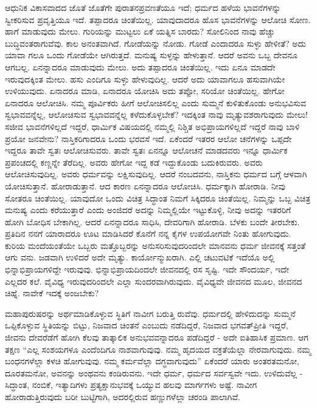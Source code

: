 ಆಧುನಿಕ ವಿಕಾಸವಾದದ ಜೊತೆ ಜೊತೆಗೇ ಪುರಾತನಪ್ರವಣತೆಯೂ  ಇದೆ; ಧರ್ಮದ ಹಳೆಯ ಭಾವನೆಗಳನ್ನು ಸ್ವೀಕರಿಸುವ ಪ್ರವೃತ್ತಿಯೂ ಇದೆ. ತಪ್ಪಾದರೂ ಚಿಂತೆಯಿಲ್ಲ. ಯಾವುದಾದರೂ ಹೊಸ ಭಾವನೆಗಳನ್ನು ಆಲೋಚಿ ಸೋಣ. ಹಾಗೆ ಮಾಡುವುದು ಮೇಲು. ಗುರಿಯನ್ನು ಮುಟ್ಟಲು ಏಕೆ ಯತ್ನಿಸ ಬಾರದು? ಸೋಲಿನಿಂದ ನಾವು ಹೆಚ್ಚು ಬುದ್ಧಿವಂತರಾಗುವೆವು. ಕಾಲ ಅನಂತವಾಗಿದೆ. ಗೋಡೆಯನ್ನು ನೋಡು. ಗೋಡೆ ಎಂದಾದರೂ ಸುಳ್ಳು ಹೇಳೀತೆ? ಅದು ಯಾವಾ ಗಲೂ ಒಂದು ಗೋಡೆಯೇ ಆಗಿರುತ್ತದೆ. ಮನುಷ್ಯ ಸುಳ್ಳನ್ನು ಹೇಳುತ್ತಾನೆ. ಆದರೆ ಅವನು ಒಬ್ಬ ದೇವನೂ ಆಗಬಲ್ಲ. ಏನನ್ನಾದರೂ ಮಾಡುವುದು ಮೇಲು. ಅದು ತಪ್ಪಾದರೂ ಚಿಂತೆಯಿಲ್ಲ. ಇದು ಏನೂ ಮಾಡದೇ ಇರುವುದಕ್ಕಿಂತ ಮೇಲು. ಹಸು ಎಂದಿಗೂ ಸುಳ್ಳು ಹೇಳುವುದಿಲ್ಲ. ಆದರೆ ಅದು ಯಾವಾಗಲೂ ಹಸುವಾಗಿಯೇ ಉಳಿಯುವುದು. ಏನಾದರೂ ಮಾಡಿ, ಏನಾದರೂ ಯೋಚಿಸಿ ಅದು ತಪ್ಪೋ, ಸರಿಯೋ ಚಿಂತೆಯಿಲ್ಲ. ಹೇಗೋ ಏನಾದರೂ ಆಲೋಚಿಸಿ. ನಮ್ಮ ಪೂರ್ವಿಕರು ಹೀಗೆ ಆಲೋಚಿಸಲಿಲ್ಲ ಎಂದು ಸುಮ್ಮನೆ ಕುಳಿತುಕೊಂಡು ಅನುಭವಿಸುವ ಸ್ವಭಾವವನ್ನೆಲ್ಲ, ಆಲೋಚಿಸುವ ಸ್ವಭಾವವನ್ನೆಲ್ಲ ಕಳೆದುಕೊಳ್ಳಬೇಕೆ? ಇದಕ್ಕಿಂತ ನಾವು ಮೃತ್ಯುವಶರಾಗುವುದು ಮೇಲು! ಸಜೀವ ಭಾವನೆಗಳಿಲ್ಲದೆ ಇದ್ದರೆ, ಧಾರ್ಮಿಕ ವಿಷಯದಲ್ಲಿ ನಮ್ಮಲ್ಲಿ ನಿಶ್ಚಿತ ಅಭಿಪ್ರಾಯಗಳಿಲ್ಲದೆ ಇದ್ದರೆ ನಾವು ಬಾಳಿ ಪ್ರಯೋ ಜನವೇನು? ನಾಸ್ತಿಕರಿಗಾದರೂ ಒಂದು ಭರವಸೆ ಇದೆ. ಏಕೆಂದರೆ ಇತರರ ಆಲೋ ಚನೆಗಳನ್ನು ಒಪ್ಪದೇ ಇದ್ದರೂ ತಾವೇ ಸ್ವತಃ ಆಲೋಚಿಸುವರು. ತಾವೇ ಸ್ವತಃ ಏನನ್ನೂ ಆಲೋಚನೆ ಮಾಡದವರು ಇನ್ನೂ ಧಾರ್ಮಿಕ ಪ್ರಪಂಚದಲ್ಲಿ ಕಣ್ಣನ್ನೇ ತೆರೆದಿಲ್ಲ. ಅವರು ಹೇಗೋ ಇದ್ದ ಕಡೆ ಇದ್ದುಕೊಂಡು ಬದುಕಿರುವರು. ಅವರು ಆಲೋಚಿಸುವುದಿಲ್ಲ. ಅವರು ಧರ್ಮವನ್ನು ಲಕ್ಷಿಸುವುದಿಲ್ಲ. ಆದರೆ ನಂಬದವನು, ನಾಸ್ತಿಕನು ಧರ್ಮದ ಬಗ್ಗೆ ಆಳವಾಗಿ ಯೋಚಿಸುತ್ತಾನೆ. ಹೋರಾಡುತ್ತಾನೆ. ಆದ ಕಾರಣ ಏನನ್ನಾದರೂ ಆಲೋಚಿಸಿ. ಧರ್ಮಕ್ಕಾಗಿ ಹೋರಾಡಿ. ನೀವು ಸೋತರೂ ಚಿಂತೆಯಿಲ್ಲ. ಯಾವುದೋ ಒಂದು ವಿಚಿತ್ರ ಸಿದ್ಧಾಂತ ನಿಮಗೆ ಸಿಕ್ಕಿದರೂ ಚಿಂತೆಯಿಲ್ಲ. ನಿಮ್ಮನ್ನು ಒಬ್ಬ ವಿಚಿತ್ರ ಮನುಷ್ಯ ಎಂದು ಕರೆಯುತ್ತಾರೆ ಎಂದು ಅಂಜಿದರೆ ಅದನ್ನು ನಿಮ್ಮಲ್ಲಿಯೇ ಇಟ್ಟುಕೊಳ್ಳಿ, ನೀವು ಅದನ್ನು ಇತರರಿಗೆ ಹೋಗಿ ಬೋಧಿಸ ಬೇಕಾಗಿಲ್ಲ. ಆದರೆ ಏನನ್ನಾದರೂ ಸಾಧಿಸಿ, ದೇವರಿಗಾಗಿ ಹೋರಾಡಿ. ಬೆಳಕು ಬಂದೇ ತೀರಬೇಕು. ಪ್ರತಿದಿನ ನನಗೆ ಯಾರಾದರೂ ಊಟ ಮಾಡಿಸಿದರೆ ಕೊನೆಗೆ ನನ್ನ ಕೈಗಳ ಉಪಯೋಗವೇ ನಿಂತು ಹೋಗುವುದು. ಕುರಿಯ ಮಂದೆಯಂತೆಯೇ ಒಬ್ಬರು ಮತ್ತೊಬ್ಬರನ್ನು ಅನುಸರಿಸುವುದರಿಂದಲೇ ಮಾನವನು ಧರ್ಮ ಜೀವನಕ್ಕೆ ಸತ್ತಂತೆ ಆಗು ವನು. ಜಡವಾಗಿ ಉಳಿದರೆ ಅದೇ ಮೃತ್ಯು. ಕಾರ್ಯೋನ್ಮುಖರಾಗಿ. ಎಲ್ಲಿ ಚಟುವಟಿಕೆ ಇದೆಯೊ ಅಲ್ಲಿ ಭಿನ್ನಾಭಿಪ್ರಾಯಗಳಿದ್ದೇ ಇರುವುವು. ಭಿನ್ನಾಭಿಪ್ರಾಯದಿಂದಲೇ ಜೀವನದಲ್ಲಿ ರಸ ಸೃಷ್ಟಿ. ಇದೇ ಸೌಂದರ್ಯ, ಇದೇ ಎಲ್ಲದರ ಕಲೆ. ವೈವಿಧ್ಯ ಇರುವುದರಿಂದಲೇ ಎಲ್ಲಾ ಸುಂದರವಾಗಿರುವುದು. ವೈವಿಧ್ಯವೇ ಜೀವನದ ಮೂಲ, ಜೀವನದ ಚಿಹ್ನೆ. ನಾವೇಕೆ ಇದಕ್ಕೆ ಅಂಜಬೇಕು?

ಮಹಾಪುರುಷರನ್ನು ಅರ್ಥಮಾಡಿಕೊಳ್ಳುವ ಸ್ಥಿತಿಗೆ ನಾವೀಗ ಬರುತ್ತಿ ರುವೆವು. ಧರ್ಮದಲ್ಲಿ ಹೇಳಿದುದನ್ನು ಸುಮ್ಮನೆ ಒಪ್ಪಿಕೊಳ್ಳುವ ಸ್ಥಿತಿಯನ್ನು ಬಿಟ್ಟು, ನಿಜವಾದ ಚಿಂತನೆ ಎಂಬುದು ನಡೆದಿದ್ದರೆ, ನಿಜವಾದ ಭಗವತ್​ಪ್ರೀತಿ ಇದ್ದರೆ, ಜೀವನು ದೇವರೆಡೆಗೆ ಹೋಗಿ ಕೆಲವು ತಾತ್ಕಾಲಿಕ ಅನುಭವವನ್ನಾದರೂ ಪಡೆದಿದ್ದರೆ - ಅದೇ ಐತಿಹಾಸಿಕ ಪ್ರಮಾಣ. ಆಗ ತಕ್ಷಣ “ಎಲ್ಲ ಸಂಶಯಗಳೂ ಎಂದೆಂದಿಗೂ ನಾಶವಾಗುವುವು. ನಮ್ಮ ಹೃದಯದ ವಕ್ರತೆಯೆಲ್ಲಾ ನೇರವಾಗುವುದು. ನಮ್ಮ ಬಂಧನಗಳೆಲ್ಲಾ ಕಳಚಿ ಹೋಗುವುವು. ನಮ್ಮ ಕರ್ಮವೆಲ್ಲಾ ದಗ್ಧವಾಗುವುದು” ಏಕೆಂದರೆ ಯಾರು ಅಂತರತಮನೋ, ದೂರತಮನೋ, ಅವನನ್ನು ಅಂಥವನು ಕಂಡಿರುವನು. ಇದೇ ಧರ್ಮ, ಧರ್ಮದ ಸರ್ವಸ್ವವೇ ಇದು. ಉಳಿದುವೆಲ್ಲ - ಸಿದ್ಧಾಂತ, ನಂಬಿಕೆ, ಇತ್ಯಾದಿಗಳು ಪ್ರತ್ಯಕ್ಷಾನುಭವಕ್ಕೆ ಒಯ್ಯುವ ಹಲವು ಮಾರ್ಗಗಳು ಅಷ್ಟೆ. ನಾವೀಗ ಹೋರಾಡುತ್ತಿರುವುದು ಬರೀ ಬುಟ್ಟಿಗಾಗಿ, ಅದರಲ್ಲಿರುವ ಹಣ್ಣುಗಳೆಲ್ಲಾ ಚರಂಡಿ ಪಾಲಾಗಿವೆ.

